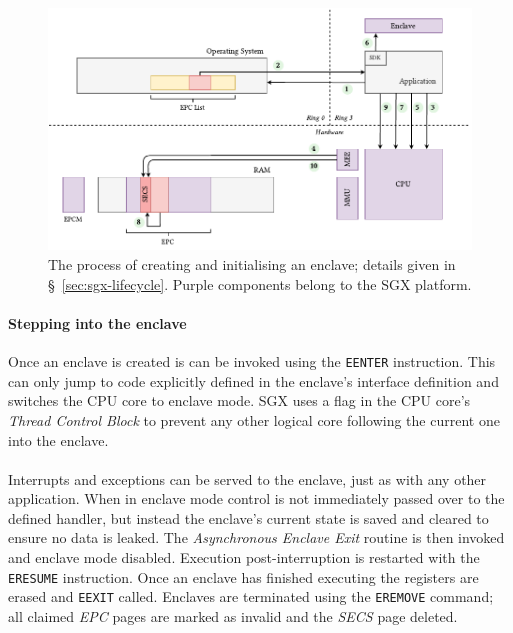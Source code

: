 \begin{figure}[]
    \centering
    \includegraphics[width=\linewidth]{figures/SGX-EnclaveCreate.pdf}
    \caption{The process of creating and initialising an enclave; details given in §~\ref{sec:sgx-lifecycle}. Purple components belong to the SGX platform.}
    \label{fig:sgx-enclavecreate}
\end{figure}

\paragraph{Stepping into the enclave} Once an enclave is created is can be invoked using the \texttt{EENTER} instruction. This can only jump to code explicitly defined in the enclave's interface definition and switches the CPU core to enclave mode. SGX uses a flag in the CPU core's \textit{Thread Control Block} to prevent any other logical core following the current one into the enclave.

\paragraph{} Interrupts and exceptions can be served to the enclave, just as with any other application. When in enclave mode control is not immediately passed over to the defined handler, but instead the enclave's current state is saved and cleared to ensure no data is leaked. The \textit{Asynchronous Enclave Exit} routine is then invoked and enclave mode disabled. Execution post-interruption is restarted with the \texttt{ERESUME} instruction. Once an enclave has finished executing the registers are erased and \texttt{EEXIT} called. Enclaves are terminated using the \texttt{EREMOVE} command; all claimed \textit{EPC} pages are marked as invalid and the \textit{SECS} page deleted.

